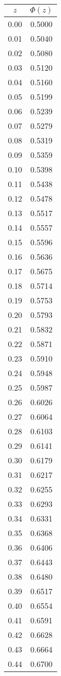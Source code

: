 \begin{tabular}{|c|c|}\hline
$z$ & $\Phi(z)$ \\ \hline
0.00 & 0.5000\\
0.01 & 0.5040\\
0.02 & 0.5080\\
0.03 & 0.5120\\
0.04 & 0.5160\\
0.05 & 0.5199\\
0.06 & 0.5239\\
0.07 & 0.5279\\
0.08 & 0.5319\\
0.09 & 0.5359\\
0.10 & 0.5398\\
0.11 & 0.5438\\
0.12 & 0.5478\\
0.13 & 0.5517\\
0.14 & 0.5557\\
0.15 & 0.5596\\
0.16 & 0.5636\\
0.17 & 0.5675\\
0.18 & 0.5714\\
0.19 & 0.5753\\
0.20 & 0.5793\\
0.21 & 0.5832\\
0.22 & 0.5871\\
0.23 & 0.5910\\
0.24 & 0.5948\\
0.25 & 0.5987\\
0.26 & 0.6026\\
0.27 & 0.6064\\
0.28 & 0.6103\\
0.29 & 0.6141\\
0.30 & 0.6179\\
0.31 & 0.6217\\
0.32 & 0.6255\\
0.33 & 0.6293\\
0.34 & 0.6331\\
0.35 & 0.6368\\
0.36 & 0.6406\\
0.37 & 0.6443\\
0.38 & 0.6480\\
0.39 & 0.6517\\
0.40 & 0.6554\\
0.41 & 0.6591\\
0.42 & 0.6628\\
0.43 & 0.6664\\
0.44 & 0.6700\\

\end{tabular}
